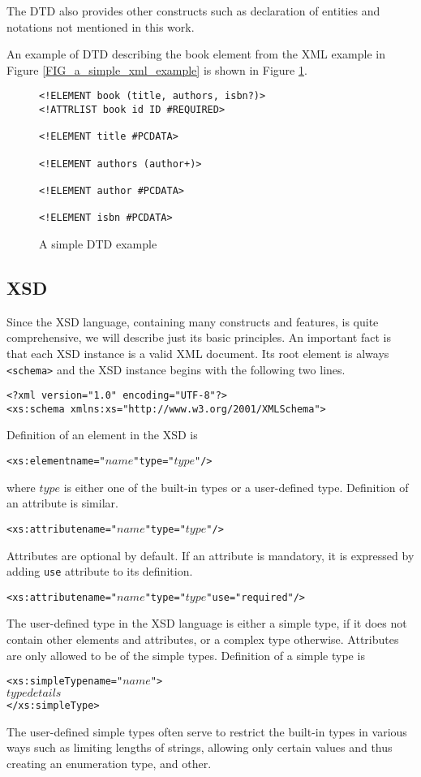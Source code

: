 The DTD also provides other constructs such as declaration of entities and notations not mentioned in this work.

An example of DTD describing the book element from the XML example in Figure \ref{FIG_a_simple_xml_example} is shown in Figure \ref{FIG_a_simple_dtd_example}.

\begin{figure}
\begin{verbatim}
<!ELEMENT book (title, authors, isbn?)>
<!ATTRLIST book id ID #REQUIRED>

<!ELEMENT title #PCDATA>

<!ELEMENT authors (author+)>

<!ELEMENT author #PCDATA>

<!ELEMENT isbn #PCDATA>
\end{verbatim}
\caption{A simple DTD example}
\label{FIG_a_simple_dtd_example}
\end{figure}

\subsection{XSD}
Since the XSD language, containing many constructs and features, is quite comprehensive, we will describe just its basic principles. An important fact is that each XSD instance is a valid XML document. Its root element is always \texttt{<schema>} and the XSD instance begins with the following two lines.

\begin{verbatim}
<?xml version="1.0" encoding="UTF-8"?>
<xs:schema xmlns:xs="http://www.w3.org/2001/XMLSchema">
\end{verbatim}

Definition of an element in the XSD is
\begin{alltt}
<xs:element name="\(name\)" type="\(type\)"/>
\end{alltt}
where $type$ is either one of the built-in types or a user-defined type. Definition of an attribute is similar.
\begin{alltt}
<xs:attribute name="\(name\)" type="\(type\)"/>
\end{alltt}
Attributes are optional by default. If an attribute is mandatory, it is expressed by adding \texttt{use} attribute to its definition.
\begin{alltt}
<xs:attribute name="\(name\)" type="\(type\)" use="required"/>
\end{alltt}

The user-defined type in the XSD language is either a simple type, if it does not contain other elements and attributes, or a complex type otherwise. Attributes are only allowed to be of the simple types. Definition of a simple type is
\begin{alltt}
<xs:simpleType name="\(name\)">
   \(type details\)
</xs:simpleType>
\end{alltt}
The user-defined simple types often serve to restrict the built-in types in various ways such as limiting lengths of strings, allowing only certain values and thus creating an enumeration type, and other.

